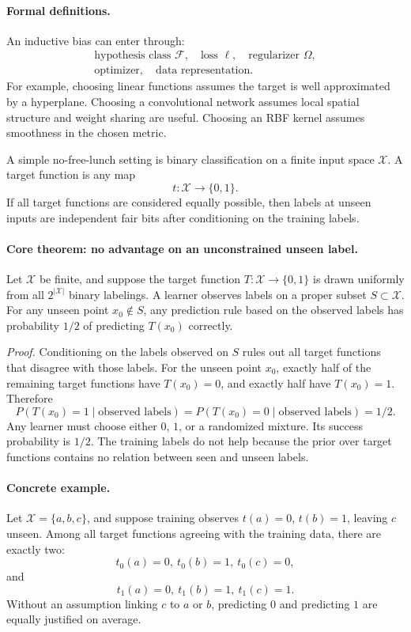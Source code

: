 \paragraph{Formal definitions.}
An inductive bias can enter through:
\[
\begin{array}{c}
\text{hypothesis class } \mathcal F,\quad
\text{loss } \ell,\quad
\text{regularizer } \Omega,\\[0.25em]
\text{optimizer},\quad
\text{data representation}.
\end{array}
\]
For example, choosing linear functions assumes the target is well approximated by a hyperplane. Choosing a convolutional network assumes local spatial structure and weight sharing are useful. Choosing an RBF kernel assumes smoothness in the chosen metric.

A simple no-free-lunch setting is binary classification on a finite input space \(\mathcal X\). A target function is any map
\[
t:\mathcal X\to\{0,1\}.
\]
If all target functions are considered equally possible, then labels at unseen inputs are independent fair bits after conditioning on the training labels.

\paragraph{Core theorem: no advantage on an unconstrained unseen label.}
Let \(\mathcal X\) be finite, and suppose the target function \(T:\mathcal X\to\{0,1\}\) is drawn uniformly from all \(2^{|\mathcal X|}\) binary labelings. A learner observes labels on a proper subset \(S\subset\mathcal X\). For any unseen point \(x_0\notin S\), any prediction rule based on the observed labels has probability \(1/2\) of predicting \(T(x_0)\) correctly.

\emph{Proof.} Conditioning on the labels observed on \(S\) rules out all target functions that disagree with those labels. For the unseen point \(x_0\), exactly half of the remaining target functions have \(T(x_0)=0\), and exactly half have \(T(x_0)=1\). Therefore
\[
P(T(x_0)=1\mid \text{observed labels})=P(T(x_0)=0\mid \text{observed labels})=1/2.
\]
Any learner must choose either \(0\), \(1\), or a randomized mixture. Its success probability is \(1/2\). The training labels do not help because the prior over target functions contains no relation between seen and unseen labels.

\paragraph{Concrete example.}
Let \(\mathcal X=\{a,b,c\}\), and suppose training observes \(t(a)=0\), \(t(b)=1\), leaving \(c\) unseen. Among all target functions agreeing with the training data, there are exactly two:
\[
t_0(a)=0,\ t_0(b)=1,\ t_0(c)=0,
\]
and
\[
t_1(a)=0,\ t_1(b)=1,\ t_1(c)=1.
\]
Without an assumption linking \(c\) to \(a\) or \(b\), predicting \(0\) and predicting \(1\) are equally justified on average.

